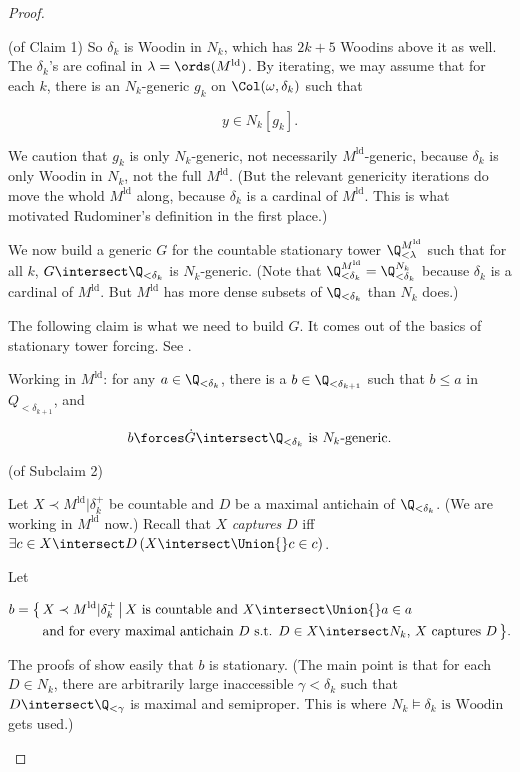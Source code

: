 \documentclass[oneside,12pt]{amsart}
\begin{document}
\begin{proof}
\begin{subproof}{(of Claim 1)}
So $\delta_k$ is Woodin in $N_k$, which has $2k+5$ Woodins above it as well. The
$\delta_k$'s are cofinal in $\lambda=\ords(M^{\text{ld}})$. By iterating,
we may assume that for each $k$, there is an $N_k$-generic $g_k$ on
$\Col(\omega,\delta_k)$ such that

$$
y\in N_k[g_k].
$$

We caution that $g_k$ is only $N_k$-generic, not necessarily $M^{\text{ld}}$-generic,
because $\delta_k$ is only Woodin in $N_k$, not the full $M^{\text{ld}}$.
(But the relevant genericity iterations do move the whold $M^{\text{ld}}$ along,
because $\delta_k$ is a cardinal of $M^{\text{ld}}$. This is what motivated
Rudominer's definition in the first place.)

We now build a generic $G$ for the countable stationary tower $\Q^{M^{\text{ld}}}_{<\lambda}$
such that for all $k$, $G\intersect \Q_{<\delta_k}$ is $N_k$-generic. (Note that
$\Q^{M^{\text{ld}}}_{<\delta_k}=\Q^{N_k}_{<\delta_k}$ because $\delta_k$ is
a cardinal of $M^{\text{ld}}$. But $M^{\text{ld}}$ has more dense subsets of $\Q_{<\delta_k}$
than $N_k$ does.)

The following claim is what we need to build $G$. It comes out of the basics of stationary tower forcing.
See \cite{Larson_Book}.

\begin{claim}[Subclaim 2]
Working in $M^{\text{ld}}$: for any $a\in\Q_{<\delta_k}$, there is a $b\in\Q_{<\delta_{k+1}}$
such that $b\leq a$ in $Q_{<\delta_{k+1}}$, and

$$
b\forces \dot{G} \intersect \Q_{<\delta_k} \text{ is } N_k\text{-generic}.
$$

\end{claim}

\begin{subproof}{(of Subclaim 2)}

Let $X\prec M^{\text{ld}} | \delta_k^+$ be countable and $D$ be a maximal antichain of $\Q_{<\delta_k}$.
(We are working in $M^{\text{ld}}$ now.) Recall that $X$ \emph{captures} $D$ iff
$\exists c \in X\intersect D \left (X\intersect \Union{}c \in c  \right)$.

Let

\begin{align*}
b = \big\{ \, &X\prec M^{\text{ld}} | \delta_k^+ \, \big| \, X \text{ is countable and } X\intersect \Union{}a \in a \\
              &\text{and for every maximal antichain $D$ s.t. $D\in X\intersect N_k$, $X$ captures } D \, \big\}.
\end{align*}

The proofs of \cite{Larson_Book} show easily that $b$ is stationary. (The main point is that for each $D\in N_k$,
there are arbitrarily large inaccessible $\gamma<\delta_k$ such that $D\intersect\Q_{<\gamma}$ is maximal
and semiproper. This is where $N_k\models \delta_k \text{ is Woodin}$ gets used.)

\end{subproof}

\end{subproof}

\end{proof}




\end{document}
